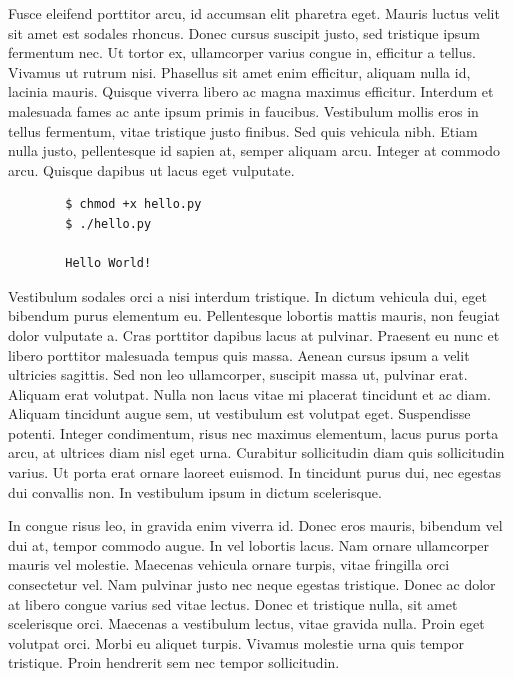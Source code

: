 \documentclass{article}
\begin{document}
Fusce eleifend porttitor arcu, id accumsan elit pharetra eget. Mauris luctus velit sit amet est sodales rhoncus. Donec cursus suscipit justo, sed tristique ipsum fermentum nec. Ut tortor ex, ullamcorper varius congue in, efficitur a tellus. Vivamus ut rutrum nisi. Phasellus sit amet enim efficitur, aliquam nulla id, lacinia mauris. Quisque viverra libero ac magna maximus efficitur. Interdum et malesuada fames ac ante ipsum primis in faucibus. Vestibulum mollis eros in tellus fermentum, vitae tristique justo finibus. Sed quis vehicula nibh. Etiam nulla justo, pellentesque id sapien at, semper aliquam arcu. Integer at commodo arcu. Quisque dapibus ut lacus eget vulputate.

\begin{commandline}
	\begin{verbatim}
		$ chmod +x hello.py
		$ ./hello.py

		Hello World!
	\end{verbatim}
\end{commandline}

Vestibulum sodales orci a nisi interdum tristique. In dictum vehicula dui, eget bibendum purus elementum eu. Pellentesque lobortis mattis mauris, non feugiat dolor vulputate a. Cras porttitor dapibus lacus at pulvinar. Praesent eu nunc et libero porttitor malesuada tempus quis massa. Aenean cursus ipsum a velit ultricies sagittis. Sed non leo ullamcorper, suscipit massa ut, pulvinar erat. Aliquam erat volutpat. Nulla non lacus vitae mi placerat tincidunt et ac diam. Aliquam tincidunt augue sem, ut vestibulum est volutpat eget. Suspendisse potenti. Integer condimentum, risus nec maximus elementum, lacus purus porta arcu, at ultrices diam nisl eget urna. Curabitur sollicitudin diam quis sollicitudin varius. Ut porta erat ornare laoreet euismod. In tincidunt purus dui, nec egestas dui convallis non. In vestibulum ipsum in dictum scelerisque.

\begin{warn}[Notice:]
  In congue risus leo, in gravida enim viverra id. Donec eros mauris, bibendum vel dui at, tempor commodo augue. In vel lobortis lacus. Nam ornare ullamcorper mauris vel molestie. Maecenas vehicula ornare turpis, vitae fringilla orci consectetur vel. Nam pulvinar justo nec neque egestas tristique. Donec ac dolor at libero congue varius sed vitae lectus. Donec et tristique nulla, sit amet scelerisque orci. Maecenas a vestibulum lectus, vitae gravida nulla. Proin eget volutpat orci. Morbi eu aliquet turpis. Vivamus molestie urna quis tempor tristique. Proin hendrerit sem nec tempor sollicitudin.
\end{warn}
\fi
\end{document}
